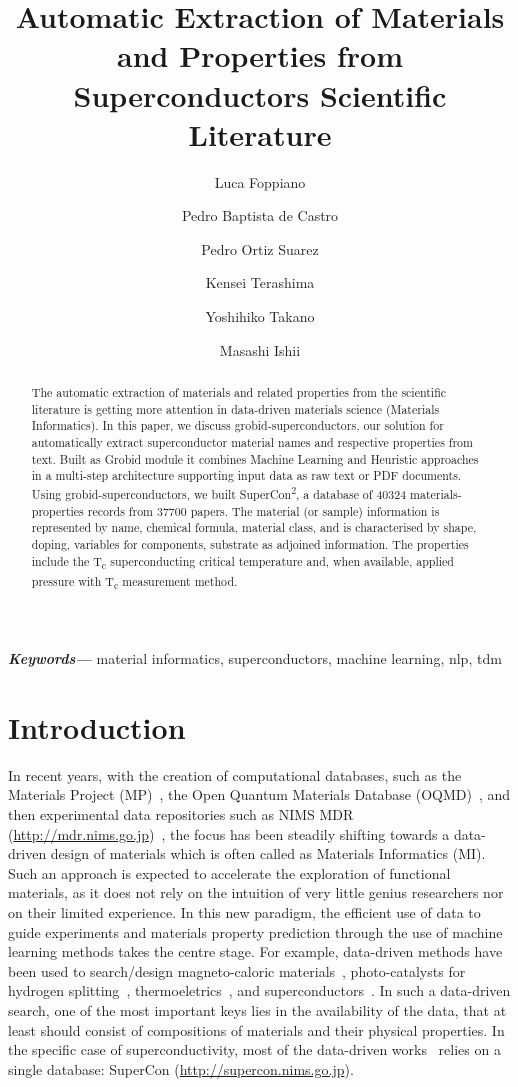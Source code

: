 \documentclass{article}
\title{Automatic Extraction of Materials and Properties from Superconductors Scientific Literature}
\author[1]{Luca Foppiano}
\author[2]{Pedro Baptista de Castro}
\author[3]{Pedro Ortiz Suarez}
\author[2]{Kensei Terashima}
\author[2]{Yoshihiko Takano}
\author[1]{Masashi Ishii}
\affil[1]{Material Database Group, MaDIS, NIMS, Tsukuba, Japan}
\affil[2]{Nano Frontier Superconducting Materials Group, MANA, NIMS, Tsukuba, Japan}
\affil[3]{Data and Web Science Group, University of Mannheim, Mannheim, Germany}
\providecommand{\keywords}[1]
{
  \small	
  \textbf{\textit{Keywords---}} #1
}
\begin{document}
\maketitle

\begin{abstract}
The automatic extraction of materials and related properties from the scientific literature is getting more attention in data-driven materials science (Materials Informatics). 
In this paper, we discuss grobid-superconductors, our solution for automatically extract superconductor material names and respective properties from text.
Built as Grobid module it combines Machine Learning and Heuristic approaches in a multi-step  architecture supporting input data as raw text or PDF documents. 
Using grobid-superconductors, we built SuperCon\textsuperscript{2}, a database of 40324 materials-properties records from 37700 papers. 
The material (or sample) information is represented by name, chemical formula, material class, and is characterised by shape, doping, variables for components, substrate as adjoined information.
The properties include the T\textsubscript{c} superconducting critical temperature and, when available, applied pressure with T\textsubscript{c} measurement method.
\end{abstract}

\keywords{material informatics, superconductors, machine learning, nlp, tdm}

\section{Introduction}
In recent years, with the creation of computational databases, such as the Materials Project (MP)~\cite{materialsprojectJain2013}, the Open Quantum Materials Database (OQMD)~\cite{oqmdkirklin2015open}, and then experimental data repositories such as NIMS MDR (\url{http://mdr.nims.go.jp})~\cite{ranganathan_anusha_2019_3553963}, the focus has been steadily shifting towards a data-driven design of materials which is often called as Materials Informatics (MI). 
Such an approach is expected to accelerate the exploration of functional materials, as it does not rely on the intuition of very little genius researchers nor on their limited experience.
In this new paradigm, the efficient use of data to guide experiments and materials property prediction through the use of machine learning methods takes the centre stage. 
For example, data-driven methods have been used to search/design magneto-caloric materials~\cite{Bocarsly2017,Castro2020-12,court2021inverse}, photo-catalysts for hydrogen splitting~\cite{xiong2021optimizing}, thermoeletrics~\cite{iwasaki2019machine}, and superconductors~\cite{stanev_machine_2017}. 
In such a data-driven search, one of the most important keys lies in the availability of the data, that at least should consist of compositions of materials and their physical properties. 
In the specific case of superconductivity, most of the data-driven works~\cite{stanev_machine_2017, le2020critical,Hamlin2019SuperconductivityNR} relies on a single database: SuperCon (\url{http://supercon.nims.go.jp}). 
\end{document}
